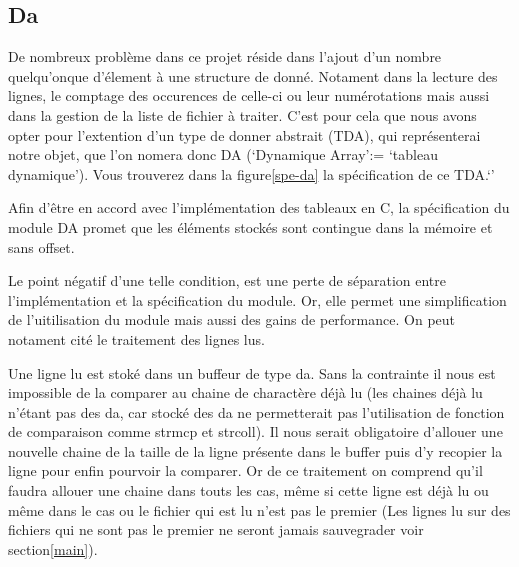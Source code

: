 \documentclass[12pt]{article}
\begin{document}
        \subsection{Da}
        
        De nombreux problème dans ce projet réside dans l'ajout d'un nombre 
        quelqu'onque d'élement à une structure de donné. Notament dans la 
        lecture des lignes, le comptage des occurences de celle-ci ou leur 
        numérotations mais aussi dans la gestion de la liste de fichier à 
        traiter. C'est pour cela que nous avons opter pour l'extention d'un type
         de donner abstrait (TDA), qui représenterai notre objet, que l'on 
         nomera donc DA (`Dynamique Array':= `tableau dynamique'). Vous 
         trouverez dans la figure\ref{spe-da} la spécification de ce TDA.`\@'

        Afin d'être en accord avec l'implémentation des tableaux en C, la 
        spécification du module DA promet que les éléments stockés sont 
        contingue dans la mémoire et sans offset.
        
        Le point négatif d'une telle condition, est une perte de séparation 
        entre l'implémentation et la spécification du module. Or, elle permet 
        une simplification de l'uitilisation du module mais aussi des gains de 
        performance. On peut notament cité le traitement des lignes lus. 

        Une ligne lu est stoké dans un buffeur de type da. Sans la contrainte il
         nous est impossible de la comparer au chaine de charactère déjà lu 
         (les chaines déjà lu n'étant pas des da, car stocké des da ne 
         permetterait pas l'utilisation de fonction de comparaison comme strmcp 
         et strcoll). Il nous serait obligatoire d'allouer une nouvelle chaine 
         de la taille de la ligne présente dans le buffer puis d'y recopier la 
         ligne pour enfin pourvoir la comparer. Or de ce traitement on comprend 
         qu'il faudra allouer une chaine dans touts les cas, même si cette ligne
          est déjà lu ou même dans le cas ou le fichier qui est lu n'est pas le 
          premier (Les lignes lu sur des fichiers qui ne sont pas le premier ne 
          seront jamais sauvegrader voir section\ref{main}). 
        
\end{document}
